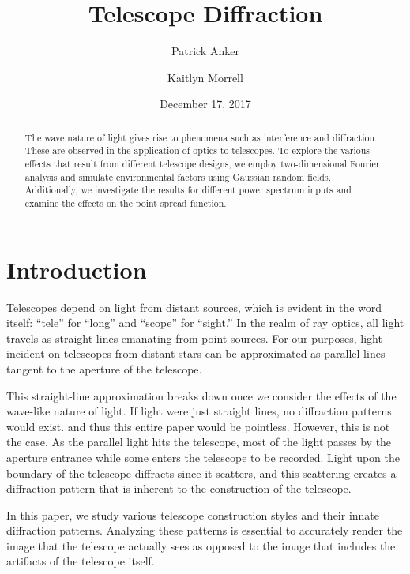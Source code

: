 \documentclass[%
 reprint,
 amsmath,amssymb,
 aps,
 pra,
]{revtex4-1}
\begin{document}
{\selectfont


\title{Telescope Diffraction}

\author{Patrick Anker}
\author{Kaitlyn Morrell}

\date{December 17, 2017}

\begin{abstract}
The wave nature of light gives rise to phenomena such as interference and diffraction. These are observed in the application of optics to telescopes. To explore the various effects that result from different telescope designs, we employ two-dimensional Fourier analysis and simulate environmental factors using Gaussian random fields. Additionally, we investigate the results for different power spectrum inputs and examine the effects on the point spread function.
\end{abstract}

\maketitle


\section{\label{sec:intro}Introduction}

Telescopes depend on light from distant sources, which is evident in the word itself: ``tele'' for ``long'' and ``scope'' for ``sight.'' In the realm of ray optics, all light travels as straight lines emanating from point sources. For our purposes, light incident on telescopes from distant stars can be approximated as parallel lines tangent to the aperture of the telescope.

This straight-line approximation breaks down once we consider the effects of the wave-like nature of light. If light were just straight lines, no diffraction patterns would exist. and thus this entire paper would be pointless. However, this is not the case. As the parallel light hits the telescope, most of the light passes by the aperture entrance while some enters the telescope to be recorded. Light upon the boundary of the telescope diffracts since it scatters, and this scattering creates a diffraction pattern that is inherent to the construction of the telescope.

In this paper, we study various telescope construction styles and their innate diffraction patterns. Analyzing these patterns is essential to accurately render the image that the telescope actually sees as opposed to the image that includes the artifacts of the telescope itself.

}
\end{document}
